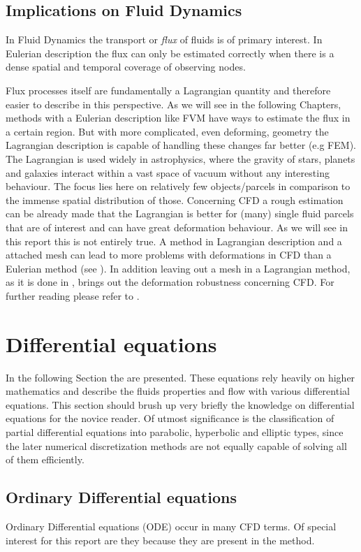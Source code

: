 \subsection{Implications on Fluid Dynamics}

In Fluid Dynamics the transport or \emph{flux} of fluids is of primary interest. In Eulerian description the flux can only be estimated correctly when there is a dense spatial and temporal coverage of observing nodes.

Flux processes itself are fundamentally a Lagrangian quantity and therefore easier to describe in this perspective. As we will see in the following Chapters, methods with a Eulerian description like FVM have ways to estimate the flux in a certain region. But with more complicated, even deforming, geometry the Lagrangian description is capable of handling these changes far better (e.g FEM). The Lagrangian is used widely in astrophysics, where the gravity of stars, planets and galaxies interact within a vast space of vacuum without any interesting behaviour. The focus lies here on relatively few objects/parcels in comparison to the immense
spatial distribution of those. Concerning CFD a rough estimation can be already made that the Lagrangian is better for (many) single fluid parcels that are of interest and can have great deformation behaviour. As we will see in this report this is not entirely true. A method in Lagrangian description and a attached mesh can lead to more problems with deformations in CFD than a Eulerian method (see ). In addition
leaving out a mesh in a Lagrangian method, as it is done in , brings out the deformation robustness concerning CFD. For further reading please refer to \citep{Bennett2006}.

\section{Differential equations}
\label{sec:diff_eq}
In the following Section the  are presented. These equations rely heavily on
higher mathematics and describe the fluids properties and flow with various differential equations. This section should brush up very briefly the knowledge on differential equations for the novice reader. Of utmost significance is the classification of partial differential equations into parabolic, hyperbolic and elliptic types, since the later numerical discretization methods are not equally capable of solving all of them efficiently.
\subsection{Ordinary Differential equations}
Ordinary Differential equations (ODE) occur in many CFD terms. Of special interest for this report are they because they are present in the  method.

